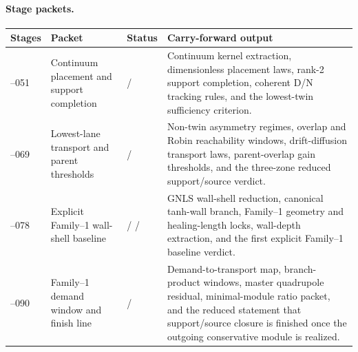 \paragraph{Stage packets.}
\begin{center}
\small
\begin{tabular}{@{}>{\raggedright\arraybackslash}p{}>{\raggedright\arraybackslash}p{}>{\raggedright\arraybackslash}p{}>{\raggedright\arraybackslash}p{}@{}}
\toprule
Stages & Packet & Status & Carry-forward output \\
\midrule
037--051 & Continuum placement and support completion & \StatusExactClosure{} / \StatusReduced{} & Continuum kernel extraction, dimensionless placement laws, rank-2 support completion, coherent D/N tracking rules, and the lowest-twin sufficiency criterion. \\
\addlinespace
052--069 & Lowest-lane transport and parent thresholds & \StatusExactClosure{} / \StatusReduced{} & Non-twin asymmetry regimes, overlap and Robin reachability windows, drift-diffusion transport laws, parent-overlap gain thresholds, and the three-zone reduced support/source verdict. \\
\addlinespace
070--078 & Explicit Family--1 wall-shell baseline & \StatusExactClosure{} / \StatusReduced{} / \StatusNumerical{} & GNLS wall-shell reduction, canonical tanh-wall branch, Family--1 geometry and healing-length locks, wall-depth extraction, and the first explicit Family--1 baseline verdict. \\
\addlinespace
079--090 & Family--1 demand window and finish line & \StatusExactClosure{} / \StatusOpen{} & Demand-to-transport map, branch-product windows, master quadrupole residual, minimal-module ratio packet, and the reduced statement that support/source closure is finished once the outgoing conservative module is realized. \\
\bottomrule
\end{tabular}
\end{center}


